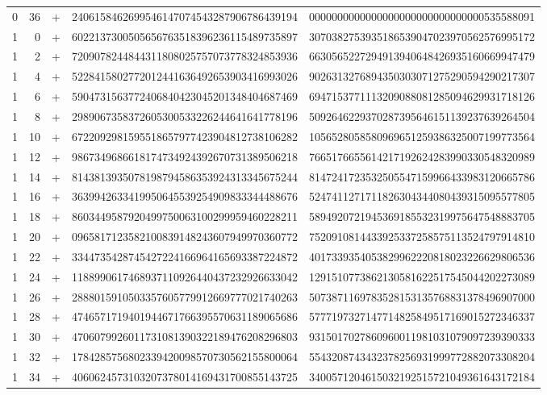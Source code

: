 \begin{longtable}{rrrll}
0 & 36 & + & 2406158462699546147074543287906786439194 & 0000000000000000000000000000000535588091 \\
1 & 0 & + & 6022137300505656763518396236115489735897 & 3070382753935186539047023970562576995172 \\
1 & 2 & + & 7209078244844311808025757073778324853936 & 6630565227294913940648426935160669947479 \\
1 & 4 & + & 5228415802772012441636492653903416993026 & 9026313276894350303071275290594290217307 \\
1 & 6 & + & 5904731563772406840423045201348404687469 & 6947153771113209088081285094629931718126 \\
1 & 8 & + & 2989067358372605300533226244641641778196 & 5092646229370287395646151139237639264504 \\
1 & 10 & + & 6722092981595518657977423904812738106282 & 1056528058580969651259386325007199773564 \\
1 & 12 & + & 9867349686618174734924392670731389506218 & 7665176655614217192624283990330548320989 \\
1 & 14 & + & 8143813935078198794586353924313345675244 & 8147241723532505547159966433983120665786 \\
1 & 16 & + & 3639942633419950645539254909833344488676 & 5247411271711826304344080439315095577805 \\
1 & 18 & + & 8603449587920499750063100299959460228211 & 5894920721945369185532319975647548883705 \\
1 & 20 & + & 0965817123582100839148243607949970360772 & 7520910814433925337258575113524797914810 \\
1 & 22 & + & 3344735428745427224166964165693387224872 & 4017339354053829962220818023226629806536 \\
1 & 24 & + & 1188990617468937110926440437232926633042 & 1291510773862130581622517545044202273089 \\
1 & 26 & + & 2888015910503357605779912669777021740263 & 5073871169783528153135768831378496907000 \\
1 & 28 & + & 4746571719401944671766395570631189065686 & 5777197327147714825849517169015272346337 \\
1 & 30 & + & 4706079926011731081390322189476208296803 & 9315017027860960011981031079097239390333 \\
1 & 32 & + & 1784285756802339420098570730562155800064 & 5543208743432378256931999772882073308204 \\
1 & 34 & + & 4060624573103207378014169431700855143725 & 3400571204615032192515721049361643172184 \\

\end{longtable}
